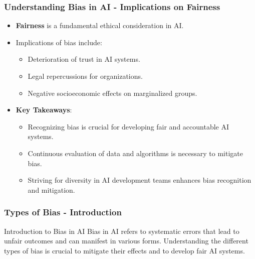 \documentclass{beamer}
\begin{document}
\begin{frame}[fragile]
    \frametitle{Understanding Bias in AI - Implications on Fairness}
    \begin{itemize}
        \item \textbf{Fairness} is a fundamental ethical consideration in AI.
        \item Implications of bias include:
        \begin{itemize}
            \item Deterioration of trust in AI systems.
            \item Legal repercussions for organizations.
            \item Negative socioeconomic effects on marginalized groups.
        \end{itemize}
        
        \item \textbf{Key Takeaways}:
        \begin{itemize}
            \item Recognizing bias is crucial for developing fair and accountable AI systems.
            \item Continuous evaluation of data and algorithms is necessary to mitigate bias.
            \item Striving for diversity in AI development teams enhances bias recognition and mitigation.
        \end{itemize}
    \end{itemize}
\end{frame}

\begin{frame}[fragile]
    \frametitle{Types of Bias - Introduction}
    \begin{block}{Introduction to Bias in AI}
        Bias in AI refers to systematic errors that lead to unfair outcomes and can manifest in various forms. 
        Understanding the different types of bias is crucial to mitigate their effects and to develop fair AI systems.
    \end{block}
\end{frame}
\end{document}
